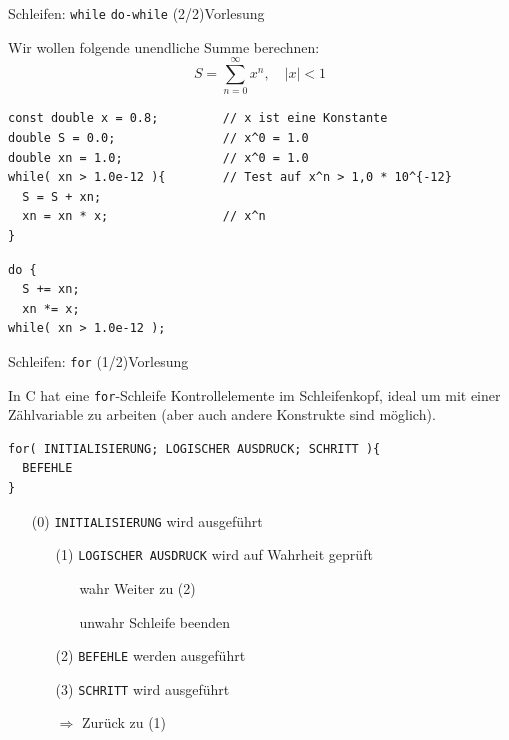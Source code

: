 \documentclass[xcolor=dvipsnames]{beamer}
\newcounter{lecturecounter}
\begin{document}
\begin{frame}[fragile]{Schleifen: \texttt{while} \texttt{do-while} (2/2)}{Vorlesung }
\begin{block}{}
Wir wollen folgende unendliche Summe berechnen:
\begin{equation*}
  S=\sum_{n=0}^\infty x^n, \quad |x| < 1
\end{equation*}
\end{block}

\begin{lstlisting}
const double x = 0.8;         // x ist eine Konstante
double S = 0.0;               // x^0 = 1.0
double xn = 1.0;              // x^0 = 1.0
while( xn > 1.0e-12 ){        // Test auf x^n > 1,0 * 10^{-12}
  S = S + xn;
  xn = xn * x;                // x^n
}
\end{lstlisting}
\begin{lstlisting}
do {
  S += xn;
  xn *= x;
while( xn > 1.0e-12 );
\end{lstlisting}

\end{frame}

\begin{frame}[fragile]{Schleifen: \texttt{for} (1/2)}{Vorlesung }
\begin{block}{}
  In C hat eine \texttt{for}-Schleife Kontrollelemente im Schleifenkopf, ideal um mit einer Zählvariable zu arbeiten (aber auch andere Konstrukte sind möglich).
\end{block}
\begin{lstlisting}
for( INITIALISIERUNG; LOGISCHER AUSDRUCK; SCHRITT ){
  BEFEHLE
}
\end{lstlisting}
\begin{enumerate}
  \item[(0)]{\texttt{INITIALISIERUNG} wird ausgeführt}
  \begin{enumerate}
    \item[(1)]{\texttt{LOGISCHER AUSDRUCK} wird auf Wahrheit geprüft}
    \begin{enumerate}
      \item[wahr]{Weiter zu (2)}
      \item[unwahr]{Schleife beenden}
    \end{enumerate}
    \item[(2)]{\texttt{BEFEHLE} werden ausgeführt}
    \item[(3)]{\texttt{SCHRITT} wird ausgeführt}
    \item[$\Rightarrow$]{Zurück zu (1)}
  \end{enumerate}
\end{enumerate}
\end{frame}
\end{document}
